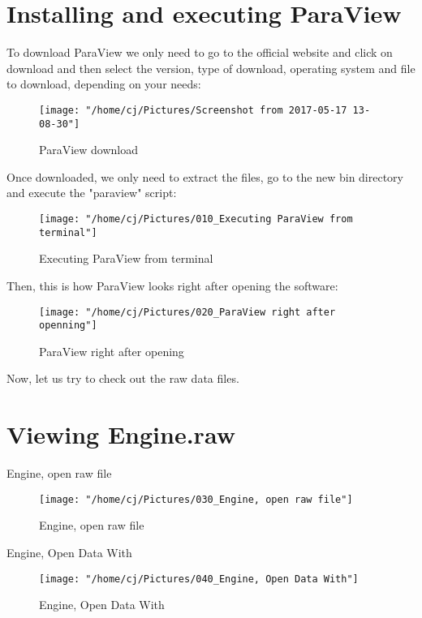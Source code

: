 \documentclass{article}
\begin{document}
\section{Installing and executing ParaView}
To download ParaView we only need to go to the official website and click on download and then select the version, type of download, operating system and file to download, depending on your needs:

\begin{figure}[H]
  \centering
  \texttt{[image: "/home/cj/Pictures/Screenshot from 2017-05-17 13-08-30"]}
  \caption{ParaView download}
  \label{}
\end{figure}

Once downloaded, we only need to extract the files, go to the new bin directory and execute the "paraview" script:

\begin{figure}[H]
  \centering
  \texttt{[image: "/home/cj/Pictures/010\_Executing ParaView from terminal"]}
  \caption{Executing ParaView from terminal}
  \label{}
\end{figure}

\break
Then, this is how ParaView looks right after opening the software:

\begin{figure}[H]
  \centering
  \texttt{[image: "/home/cj/Pictures/020\_ParaView right after openning"]}
  \caption{ParaView right after opening}
  \label{}
\end{figure}

Now, let us try to check out the raw data files.
\newpage
\section{Viewing Engine.raw}

Engine, open raw file

\begin{figure}[H]
  \centering
  \texttt{[image: "/home/cj/Pictures/030\_Engine, open raw file"]}
  \caption{Engine, open raw file}
  \label{}
\end{figure}


Engine, Open Data With

\begin{figure}[H]
  \centering
  \texttt{[image: "/home/cj/Pictures/040\_Engine, Open Data With"]}
  \caption{Engine, Open Data With}
  \label{}
\end{figure}
\end{document}
